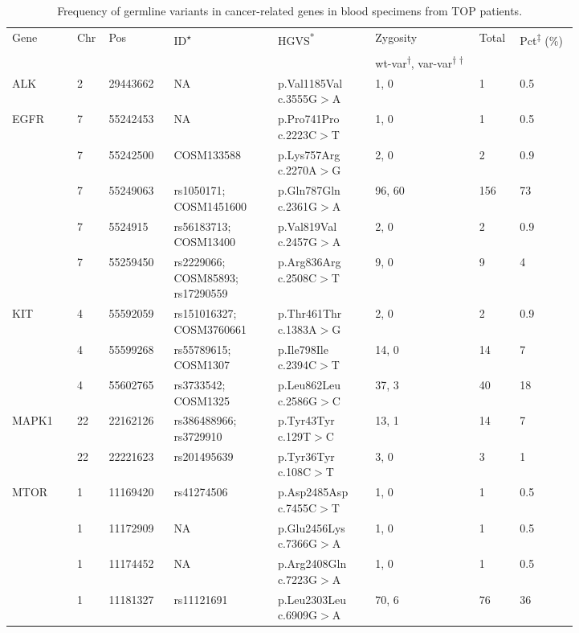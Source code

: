 \newpage
\begin{longtable}{p{0.1\linewidth}|p{0.02\linewidth}p{0.1\linewidth}p{0.16\linewidth}p{0.15\linewidth}p{0.16\linewidth}p{0.04\linewidth}p{0.09\linewidth}}
\caption{Frequency of germline variants in cancer-related genes in blood specimens from TOP patients.}
\label{tbl:freq_cancer_genes}
    \\
    \hline
    Gene & Chr & Pos & ID\textsuperscript{$\star$} & HGVS\textsuperscript{*} & Zygosity & Total & Pct\textsuperscript{$\ddagger$} (\%)
		\\
		&
    \multicolumn{4}{l}{}
		&
		\multicolumn{1}{l}{wt-var\textsuperscript{$\dagger$}, var-var\textsuperscript{$\dagger\dagger$}}
		&
		\multicolumn{2}{l}{}
		\\
    \hline
		ALK & 2 & 29443662 & NA & p.Val1185Val c.3555G$>$A & 1, 0 & 1 & 0.5
		\\
		\hline
		EGFR & 7 & 55242453 & NA & p.Pro741Pro c.2223C$>$T & 1, 0 & 1 & 0.5
		\\
		& 7 & 55242500 & COSM133588 & p.Lys757Arg c.2270A$>$G & 2, 0 & 2 & 0.9
		\\
		& 7 & 55249063 & rs1050171; COSM1451600 & p.Gln787Gln c.2361G$>$A & 96, 60 & 156 & 73
		\\
		& 7 & 5524915 & rs56183713; COSM13400 & p.Val819Val c.2457G$>$A & 2, 0 & 2 & 0.9
		\\
		& 7 & 55259450 & rs2229066; COSM85893; rs17290559 & p.Arg836Arg c.2508C$>$T & 9, 0 & 9 & 4
		\\
    \hline
		KIT & 4 & 55592059 & rs151016327; COSM3760661 & p.Thr461Thr c.1383A$>$G & 2, 0 & 2 & 0.9
		\\
		& 4 & 55599268 & rs55789615; COSM1307 & p.Ile798Ile c.2394C$>$T & 14, 0 & 14 & 7
		\\
		& 4 & 55602765 & rs3733542; COSM1325 & p.Leu862Leu c.2586G$>$C & 37, 3 & 40 & 18
		\\
		\hline
		MAPK1 & 22 & 22162126 & rs386488966; rs3729910 & p.Tyr43Tyr c.129T$>$C & 13, 1 & 14 & 7
		\\
		& 22 & 22221623 & rs201495639 & p.Tyr36Tyr c.108C$>$T & 3, 0 & 3 & 1
		\\
		\hline
		MTOR & 1 & 11169420 & rs41274506 & p.Asp2485Asp c.7455C$>$T & 1, 0 & 1 & 0.5
		\\
		& 1 & 11172909 & NA & p.Glu2456Lys c.7366G$>$A & 1, 0 & 1 & 0.5
		\\
		& 1 & 11174452 & NA & p.Arg2408Gln c.7223G$>$A & 1, 0 & 1 & 0.5
		\\
		& 1 & 11181327 & rs11121691 & p.Leu2303Leu c.6909G$>$A & 70, 6 & 76 & 36

\end{longtable}
